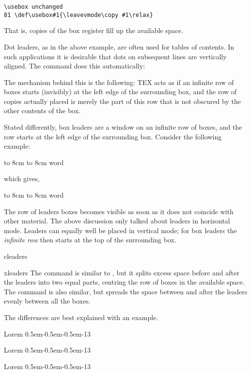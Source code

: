 \begin{verbatim}
\usebox unchanged
81 \def\usebox#1{\leavevmode\copy #1\relax}
\end{verbatim}

That is, copies of the box register fill up the available space.

Dot leaders, as in the above example, are often used for tables of contents. In such applications it
is desirable that dots on subsequent lines are vertically aligned. The command does this
automatically:


The mechanism behind this is the following: TEX acts as if an infinite row of boxes starts (invisibly)
at the left edge of the surrounding box, and the row of copies actually placed is merely the part of
this row that is not obscured by the other contents of the box.

Stated differently, box leaders are a window on an infinite row of boxes, and the row starts at the
left edge of the surrounding box. Consider the following example:

\begin{texexample}{}{}
\hbox to 8cm {\leaders\copy\centerdot\hfil}
\hbox to 8cm {word\leaders\copy\centerdot\hfil}
\end{texexample}

which gives,

\hbox to 8cm {\leaders\copy\centerdot\hfil}
\hbox to 8cm {word\leaders\copy\centerdot\hfil}

The row of leaders boxes becomes visible as soon as it does not coincide with other material.
The above discussion only talked about leaders in horizontal mode. Leaders can equally well be
placed in vertical mode; for box leaders the \textit{infinite row} then starts at the top of the surrounding
box.


\begin{docCommand}{cleaders}{}
\begin{docCommand}{xleaders}{}
The  command is similar to 
, but it splits excess space before and after the leaders into two equal parts, centring the row of boxes in the available space.
The  command is also similar, but spreads the space between and after the leaders evenly between all the boxes.
\end{docCommand}
\end{docCommand}

The differences are best explained with an example.

\begin{texexample}{}{}
\def\leaderpattern{\hbox{\kern0.5em-\kern0.5em-\kern0.5em-}}
Lorem \leaders\leaderpattern\hfill 13\par
Lorem \cleaders\leaderpattern\hfill 13\par
Lorem \xleaders\leaderpattern\hfill 13\par

\meaning\xleaders
\end{texexample}




